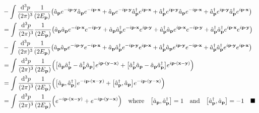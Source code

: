 \documentclass{article}
\begin{document}
\begin{align*}
                                       & -\int\frac{\dd[3]{p}}{(2\pi)^3}\frac{1}{(2E_{\vb{p}})}\pqty{\hat{a}_{\vb{p}}e^{-i\vb{p}\vdot\vb{y}}\hat{a}_{\vb{p}}e^{-i\vb{p}\vdot\vb{x}}+\hat{a}_{\vb{p}}e^{-i\vb{p}\vdot\vb{y}}\hat{a}^\dagger_{\vb{p}}e^{i\vb{p}\vdot\vb{x}}+\hat{a}^\dagger_{\vb{p}}e^{i\vb{p}\vdot\vb{y}}\hat{a}_{\vb{p}}e^{-i\vb{p}\vdot\vb{x}}+\hat{a}^\dagger_{\vb{p}}e^{i\vb{p}\vdot\vb{y}}\hat{a}^\dagger_{\vb{p}}e^{i\vb{p}\vdot\vb{x}}} \\
                                       & =\int\frac{\dd[3]{p}}{(2\pi)^3}\frac{1}{(2E_{\vb{p}})}\pqty{\hat{a}_{\vb{p}}\hat{a}_{\vb{p}}e^{-i\vb{p}\vdot\vb{x}}e^{-i\vb{p}\vdot\vb{y}}+\hat{a}_{\vb{p}}\hat{a}^\dagger_{\vb{p}}e^{-i\vb{p}\vdot\vb{x}}e^{i\vb{p}\vdot\vb{y}}+\hat{a}^\dagger_{\vb{p}}\hat{a}_{\vb{p}}e^{i\vb{p}\vdot\vb{x}}e^{-i\vb{p}\vdot\vb{y}}+\hat{a}^\dagger_{\vb{p}}\hat{a}^\dagger_{\vb{p}}e^{i\vb{p}\vdot\vb{x}}e^{i\vb{p}\vdot\vb{y}}} \\
                                       & -\int\frac{\dd[3]{p}}{(2\pi)^3}\frac{1}{(2E_{\vb{p}})}\pqty{\hat{a}_{\vb{p}}\hat{a}_{\vb{p}}e^{-i\vb{p}\vdot\vb{y}}e^{-i\vb{p}\vdot\vb{x}}+\hat{a}_{\vb{p}}\hat{a}^\dagger_{\vb{p}}e^{-i\vb{p}\vdot\vb{y}}e^{i\vb{p}\vdot\vb{x}}+\hat{a}^\dagger_{\vb{p}}\hat{a}_{\vb{p}}e^{i\vb{p}\vdot\vb{y}}e^{-i\vb{p}\vdot\vb{x}}+\hat{a}^\dagger_{\vb{p}}\hat{a}^\dagger_{\vb{p}}e^{i\vb{p}\vdot\vb{y}}e^{i\vb{p}\vdot\vb{x}}} \\
                                       & =\int\frac{\dd[3]{p}}{(2\pi)^3}\frac{1}{(2E_{\vb{p}})}\pqty{\bqty{\hat{a}_{\vb{p}}\hat{a}^\dagger_{\vb{p}}-\hat{a}^\dagger_{\vb{p}}\hat{a}_{\vb{p}}}e^{i\vb{p}\vdot\pqty{\vb{y}-\vb{x}}}+\bqty{\hat{a}^\dagger_{\vb{p}}\hat{a}_{\vb{p}}-\hat{a}_{\vb{p}}\hat{a}^\dagger_{\vb{p}}}e^{i\vb{p}\vdot\pqty{\vb{x}-\vb{y}}}}                                                                                               \\
                                       & =\int\frac{\dd[3]{p}}{(2\pi)^3}\frac{1}{(2E_{\vb{p}})}\pqty{\bqty{\hat{a}_{\vb{p}},\hat{a}^\dagger_{\vb{p}}}e^{-i\vb{p}\vdot\pqty{\vb{x}-\vb{y}}}+\bqty{\hat{a}^\dagger_{\vb{p}},\hat{a}_{\vb{p}}          }e^{-i\vb{p}\vdot\pqty{\vb{y}-\vb{x}}}}                                                                                                                                                                   \\
                                       & =\int\frac{\dd[3]{p}}{(2\pi)^3}\frac{1}{(2E_{\vb{p}})}\pqty{e^{-i\vb{p}\vdot\pqty{\vb{x}-\vb{y}}}+e^{-i\vb{p}\vdot\pqty{\vb{y}-\vb{x}}}}\qq{where}\bqty{\hat{a}_{\vb{p}},\hat{a}^\dagger_{\vb{p}}}=1\qand \bqty{\hat{a}^\dagger_{\vb{p}},\hat{a}_{\vb{p}}          }=-1 \quad\blacksquare                                                                                                                            \\
\end{align*}
\end{document}

